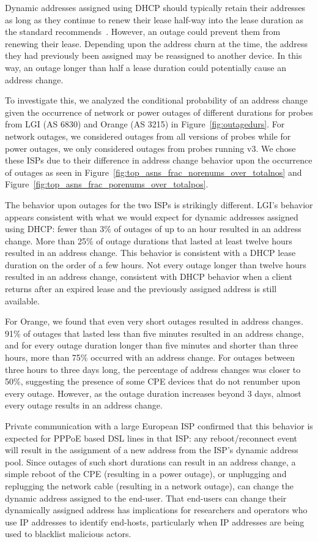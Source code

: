 Dynamic addresses assigned using DHCP should typically retain
their addresses as long as they continue to renew their lease half-way
into the lease duration as the standard
recommends~\cite{rfc2131}. However, an outage could
prevent them from renewing their lease. Depending upon the address
churn at the time, the address they had previously been assigned may
be reassigned to another device.  In this way, an outage
longer than half a lease duration could potentially cause an address
change.

To investigate this, we analyzed the conditional probability of an
address change given the occurrence of network or power outages of different durations
for probes from LGI (AS 6830) and
Orange (AS 3215) in Figure~\ref{fig:outagedurs}. For network outages,
we considered outages from all versions of probes while for power
outages, we only considered outages from probes running v3.
We chose these ISPs
due to their difference in address change behavior upon the occurrence
of outages as seen in
Figure~\ref{fig:top_asns_frac_norenums_over_totalnos} and
Figure~\ref{fig:top_asns_frac_porenums_over_totalpos}.

The behavior upon outages for the two ISPs is strikingly
different. LGI's behavior appears consistent with what we would 
expect for dynamic addresses assigned using DHCP: fewer than
3\% of outages of up to an hour resulted in an address
change.  More than 25\% of outage
durations that lasted at least twelve hours resulted in an address
change. This behavior is consistent with a DHCP lease duration on the
order of a few hours.  Not every outage longer than twelve
hours resulted in an address change, consistent with DHCP 
behavior when a client returns after an expired lease and the
previously assigned address
is still available.

For Orange, we found that even very short outages resulted in
address changes. 91\% of outages that lasted less than five
minutes resulted in an address change, and for every outage duration
longer than five minutes and shorter than three hours, more than 75\% occurred with an
address change. For outages between three hours to three days
long, the percentage of address changes was closer to 50\%, suggesting
the presence of some CPE devices that do not renumber upon every outage. However, as the
outage duration increases beyond 3 days, almost every outage results
in an address change.

Private communication with a large European ISP confirmed that this
behavior is expected for PPPoE based DSL lines in that ISP: any
reboot/reconnect event will result in the assignment of a new address
from the ISP's dynamic address pool. Since outages of such short
durations can result in an address change, a simple reboot of the CPE
(resulting in a power outage), or unplugging and replugging the
network cable (resulting in a network outage), can change the dynamic
address assigned to the end-user. That end-users can change their
dynamically assigned address has implications for researchers and
operators who use IP addresses to identify end-hosts, particularly
when IP addresses are being used to blacklist malicious actors.

